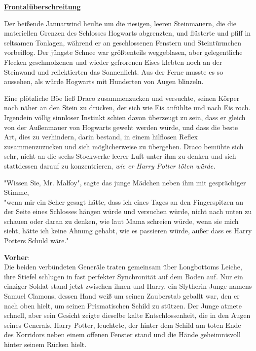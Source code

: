

\hypertarget{frontaluxfcberschreitungen}{%

\textbf{\uline{Frontalüberschreitung}}

Der beißende Januarwind heulte um die riesigen, leeren Steinmauern, die die materiellen Grenzen des Schlosses Hogwarts abgrenzten, und flüsterte und pfiff in seltsamen Tonlagen, während er an geschlossenen Fenstern und Steintürmchen vorbeiflog. Der jüngste Schnee war größtenteils weggeblasen, aber gelegentliche Flecken geschmolzenen und wieder gefrorenen Eises klebten noch an der Steinwand und reflektierten das Sonnenlicht. Aus der Ferne musste es so aussehen, als würde Hogwarts mit Hunderten von Augen blinzeln.

Eine plötzliche Böe ließ Draco zusammenzucken und versuchte, seinen Körper noch näher an den Stein zu drücken, der sich wie Eis anfühlte und nach Eis roch. Irgendein völlig sinnloser Instinkt schien davon überzeugt zu sein, dass er gleich von der Außenmauer von Hogwarts geweht werden würde, und dass die beste Art, dies zu verhindern, darin bestand, in einem hilflosen Reflex zusammenzuzucken und sich möglicherweise zu übergeben. Draco bemühte sich sehr, nicht an die sechs Stockwerke leerer Luft unter ihm zu denken und sich stattdessen darauf zu konzentrieren, \emph{wie er Harry Potter töten würde.}

"Wissen Sie, Mr. Malfoy", sagte das junge Mädchen neben ihm mit gesprächiger Stimme,\\ "wenn mir ein Seher gesagt hätte, dass ich eines Tages an den Fingerspitzen an der Seite eines Schlosses hängen würde und versuchen würde, nicht nach unten zu schauen oder daran zu denken, wie laut Mama schreien würde, wenn sie mich sieht, hätte ich keine Ahnung gehabt, wie es passieren würde, außer dass es Harry Potters Schuld wäre."

\textbf{Vorher}:\\ Die beiden verbündeten Generäle traten gemeinsam über Longbottoms Leiche, ihre Stiefel schlugen in fast perfekter Synchronität auf dem Boden auf. Nur ein einziger Soldat stand jetzt zwischen ihnen und Harry, ein Slytherin-Junge namens Samuel Clamons, dessen Hand weiß um seinen Zauberstab geballt war, den er nach oben hielt, um seinen Prismatischen Schild zu stützen. Der Junge atmete schnell, aber sein Gesicht zeigte dieselbe kalte Entschlossenheit, die in den Augen seines Generals, Harry Potter, leuchtete, der hinter dem Schild am toten Ende des Korridors neben einem offenen Fenster stand und die Hände geheimnisvoll hinter seinem Rücken hielt.

}

